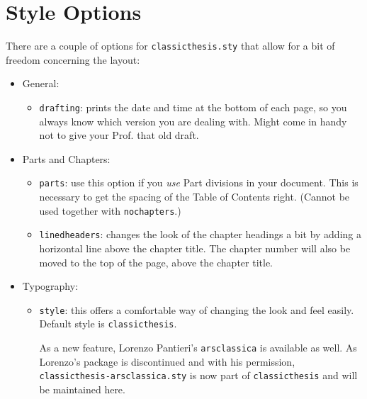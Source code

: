 \clearpage
\section{Style Options}\label{sec:options}
There are a couple of options for \texttt{classicthesis.sty} that
allow for a bit of freedom concerning the layout:
\begin{itemize}
    \item General:
          \begin{itemize}
              \item\texttt{drafting}: prints the date and time at the bottom of
                    each page, so you always know which version you are dealing with.
                    Might come in handy not to give your Prof. that old draft.
          \end{itemize}

    \item Parts and Chapters:
          \begin{itemize}
              \item\texttt{parts}: use this option if you \emph{use} Part
                    divisions in your document. This is necessary to get the
                    spacing of the Table of Contents right.
                    (Cannot be used together with \texttt{nochapters}.)

              \item\texttt{linedheaders}: changes the look of the chapter
                    headings a bit by adding a horizontal line above the chapter
                    title. The chapter number will also be moved to the top of the
                    page, above the chapter title.
          \end{itemize}

    \item Typography:
          \begin{itemize}
              \item\texttt{style}: this offers a comfortable way of changing the look and feel easily. Default style is \texttt{classicthesis}.

                    As a new feature, Lorenzo Pantieri's \texttt{arsclassica} is available as well. As Lorenzo's package is discontinued and with his permission, \texttt{classicthesis-arsclassica.sty} is now part of \texttt{classicthesis} and will be maintained here.


\end{itemize}
\end{itemize}
